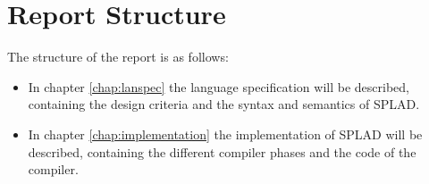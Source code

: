 \section{Report Structure}
The structure of the report is as follows:
\begin{itemize}
	\item In chapter \ref{chap:lanspec} the language specification will be described, containing the design criteria and the syntax and semantics of SPLAD.
	\item In chapter \ref{chap:implementation} the implementation of SPLAD will be described, containing the different compiler phases and the code of the compiler.
\end{itemize}